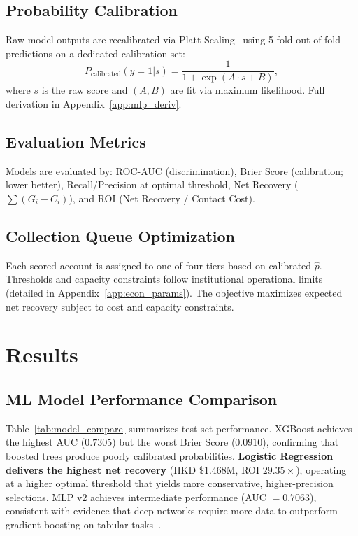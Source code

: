 \documentclass[11pt, a4paper]{article}
\begin{document}
\subsection{Probability Calibration}

Raw model outputs are recalibrated via Platt Scaling~\cite{platt1999} using 5-fold out-of-fold predictions on a dedicated calibration set:
\begin{equation}\label{eq:platt}
P_{\text{calibrated}}(y=1|s) = \frac{1}{1 + \exp(A \cdot s + B)},
\end{equation}
where $s$ is the raw score and $(A,B)$ are fit via maximum likelihood. Full derivation in Appendix~\ref{app:mlp_deriv}.

\subsection{Evaluation Metrics}

Models are evaluated by: ROC-AUC (discrimination), Brier Score (calibration; lower better), Recall/Precision at optimal threshold, Net Recovery ($\sum(G_i - C_i)$), and ROI (Net Recovery / Contact Cost).

\subsection{Collection Queue Optimization}

Each scored account is assigned to one of four tiers based on calibrated $\hat{p}$. Thresholds and capacity constraints follow institutional operational limits (detailed in Appendix~\ref{app:econ_params}). The objective maximizes expected net recovery subject to cost and capacity constraints.


\section{Results}\label{sec:results}

\subsection{ML Model Performance Comparison}

Table~\ref{tab:model_compare} summarizes test-set performance. XGBoost achieves the highest AUC ($0.7305$) but the worst Brier Score ($0.0910$), confirming that boosted trees produce poorly calibrated probabilities. \textbf{Logistic Regression delivers the highest net recovery} (HKD \$1.468M, ROI $29.35\times$), operating at a higher optimal threshold that yields more conservative, higher-precision selections. MLP v2 achieves intermediate performance (AUC $=0.7063$), consistent with evidence that deep networks require more data to outperform gradient boosting on tabular tasks~\cite{grinsztajn2022}.
\end{document}
